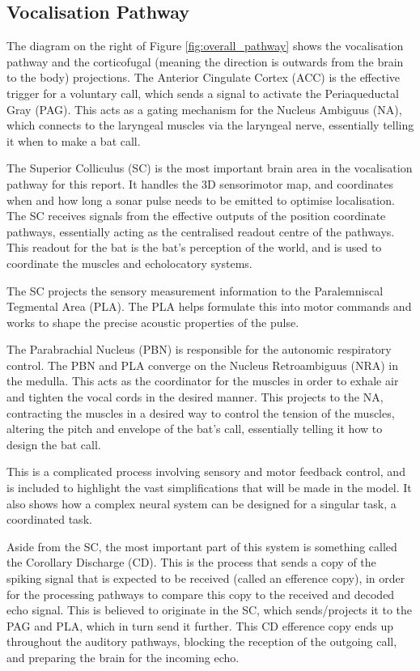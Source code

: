 \subsection{Vocalisation Pathway}

The diagram on the right of Figure \ref{fig:overall_pathway} shows the vocalisation pathway and the corticofugal (meaning the direction is outwards from the brain to the body) projections. The Anterior Cingulate Cortex (ACC) is the effective trigger for a voluntary call, which sends a signal to activate the Periaqueductal Gray (PAG). This acts as a gating mechanism for the Nucleus Ambiguus (NA), which connects to the laryngeal muscles via the laryngeal nerve, essentially telling it when to make a bat call. 

The Superior Colliculus (SC) is the most important brain area in the vocalisation pathway for this report. It handles the 3D sensorimotor map, and coordinates when and how long a sonar pulse needs to be emitted to optimise localisation. The SC receives signals from the effective outputs of the position coordinate pathways, essentially acting as the centralised readout centre of the pathways. This readout for the bat is the bat's perception of the world, and is used to coordinate the muscles and echolocatory systems.

The SC projects the sensory measurement information to the Paralemniscal Tegmental Area (PLA). The PLA helps formulate this into motor commands and works to shape the precise acoustic properties of the pulse. 

The Parabrachial Nucleus (PBN) is responsible for the autonomic respiratory control. The PBN and PLA converge on the Nucleus Retroambiguus (NRA) in the medulla. This acts as the coordinator for the muscles in order to exhale air and tighten the vocal cords in the desired manner. This projects to the NA, contracting the muscles in a desired way to control the tension of the muscles, altering the pitch and envelope of the bat's call, essentially telling it how to design the bat call.

This is a complicated process involving sensory and motor feedback control, and is included to highlight the vast simplifications that will be made in the model. It also shows how a complex neural system can be designed for a singular task, a coordinated task.

Aside from the SC, the most important part of this system is something called the Corollary Discharge (CD). This is the process that sends a copy of the spiking signal that is expected to be received (called an efference copy), in order for the processing pathways to compare this copy to the received and decoded echo signal. This is believed to originate in the SC, which sends/projects it to the PAG and PLA, which in turn send it further. This CD efference copy ends up throughout the auditory pathways, blocking the reception of the outgoing call, and preparing the brain for the incoming echo.


